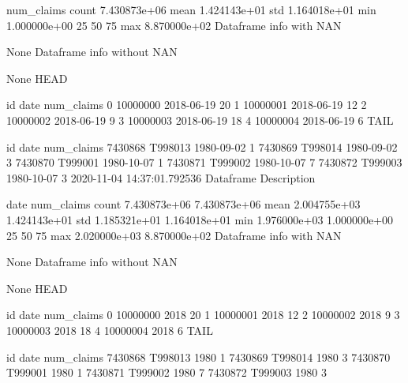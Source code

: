          num_claims
count  7.430873e+06
mean   1.424143e+01
std    1.164018e+01
min    1.000000e+00
25%
50%
75%
max    8.870000e+02
Dataframe info with NAN 

None
Dataframe info without NAN 

None
HEAD 

         id        date  num_claims
0  10000000  2018-06-19          20
1  10000001  2018-06-19          12
2  10000002  2018-06-19           9
3  10000003  2018-06-19          18
4  10000004  2018-06-19           6
TAIL 

              id        date  num_claims
7430868  T998013  1980-09-02           1
7430869  T998014  1980-09-02           3
7430870  T999001  1980-10-07           1
7430871  T999002  1980-10-07           7
7430872  T999003  1980-10-07           3
2020-11-04 14:37:01.792536
Dataframe Description 

               date    num_claims
count  7.430873e+06  7.430873e+06
mean   2.004755e+03  1.424143e+01
std    1.185321e+01  1.164018e+01
min    1.976000e+03  1.000000e+00
25%
50%
75%
max    2.020000e+03  8.870000e+02
Dataframe info with NAN 

None
Dataframe info without NAN 

None
HEAD 

         id  date  num_claims
0  10000000  2018          20
1  10000001  2018          12
2  10000002  2018           9
3  10000003  2018          18
4  10000004  2018           6
TAIL 

              id  date  num_claims
7430868  T998013  1980           1
7430869  T998014  1980           3
7430870  T999001  1980           1
7430871  T999002  1980           7
7430872  T999003  1980           3
